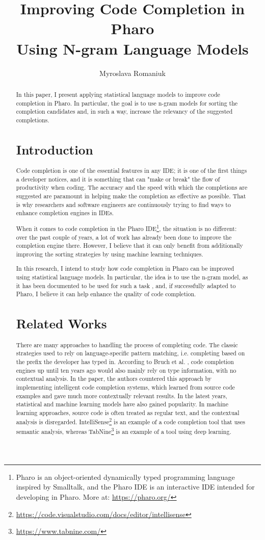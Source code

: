 \documentclass[sigconf,screen]{acmart}
\title{Improving Code Completion in Pharo\\Using N-gram Language Models}
\author{Myroslava Romaniuk}
\affiliation{\institution{Ukrainian Catholic University} \city{Lviv} \country{Ukraine}}
\begin{document}
\begin{abstract}
In this paper, I present applying statistical language models to improve code completion in Pharo. In particular, the goal is to use n-gram models for sorting the completion candidates and, in such a way, increase the relevancy of the suggested completions.

\section{Introduction}
Code completion is one of the essential features in any IDE; it is one of the first things a developer notices, and it is something that can "make or break" the flow of productivity when coding. The accuracy and the speed with which the completions are suggested are paramount in helping make the completion as effective as possible. That is why researchers and software engineers are continuously trying to find ways to enhance completion engines in IDEs.

When it comes to code completion in the Pharo IDE\footnote{Pharo is an object-oriented dynamically typed programming language inspired by Smalltalk, and the Pharo IDE is an interactive IDE intended for developing in Pharo. More at: \url{https://pharo.org/}}, the situation is no different: over the past couple of years, a lot of work has already been done to improve the completion engine there. However, I believe that it can only benefit from additionally improving the sorting strategies by using machine learning techniques.

In this research, I intend to study how code completion in Pharo can be improved using statistical language models. In particular, the idea is to use the n-gram model, as it has been documented to be used for such a task \cite{Hind12a}, and, if successfully adapted to Pharo, I believe it can help enhance the quality of code completion.

\section{Related Works}
There are many approaches to handling the process of completing code. The classic strategies used to rely on language-specific pattern matching, i.e. completing based on the prefix the developer has typed in. According to Bruch et al. \cite{Bruc09a}, code completion engines up until ten years ago would also mainly rely on type information, with no contextual analysis. In the paper, the authors countered this approach by implementing intelligent code completion systems, which learned from source code examples and gave much more contextually relevant results. In the latest years, statistical and machine learning models have also gained popularity. In machine learning approaches, source code is often treated as regular text, and the contextual analysis is disregarded. IntelliSense\footnote{\url{https://code.visualstudio.com/docs/editor/intellisense}} is an example of a code completion tool that uses semantic analysis, whereas TabNine\footnote{\url{https://www.tabnine.com/}} is an example of a tool using deep learning.


\end{abstract}
\end{document}
